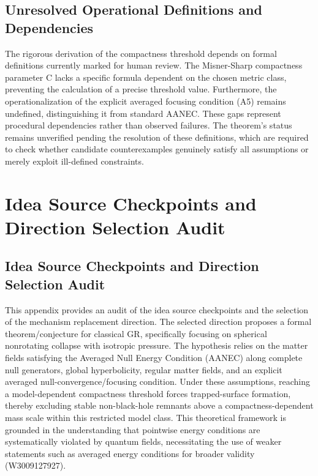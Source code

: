 \documentclass[conference]{IEEEtran}
\begin{document}
\subsection{Unresolved Operational Definitions and Dependencies}
The rigorous derivation of the compactness threshold depends on formal definitions currently marked for human review. The Misner-Sharp compactness parameter C lacks a specific formula dependent on the chosen metric class, preventing the calculation of a precise threshold value. Furthermore, the operationalization of the explicit averaged focusing condition (A5) remains undefined, distinguishing it from standard AANEC. These gaps represent procedural dependencies rather than observed failures. The theorem's status remains unverified pending the resolution of these definitions, which are required to check whether candidate counterexamples genuinely satisfy all assumptions or merely exploit ill-defined constraints.

\section{Idea Source Checkpoints and Direction Selection Audit}
\subsection{Idea Source Checkpoints and Direction Selection Audit}
This appendix provides an audit of the idea source checkpoints and the selection of the mechanism replacement direction. The selected direction proposes a formal theorem/conjecture for classical GR, specifically focusing on spherical nonrotating collapse with isotropic pressure. The hypothesis relies on the matter fields satisfying the Averaged Null Energy Condition (AANEC) along complete null generators, global hyperbolicity, regular matter fields, and an explicit averaged null-convergence/focusing condition. Under these assumptions, reaching a model-dependent compactness threshold forces trapped-surface formation, thereby excluding stable non-black-hole remnants above a compactness-dependent mass scale within this restricted model class. This theoretical framework is grounded in the understanding that pointwise energy conditions are systematically violated by quantum fields, necessitating the use of weaker statements such as averaged energy conditions for broader validity (W3009127927).~\cite{cite_0ed84243cf171bc4}
\end{document}
